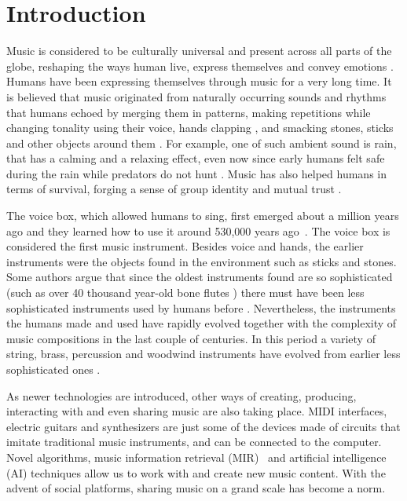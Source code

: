 \documentclass[sigchi]{acmart}
\begin{document}
\section{Introduction}
Music is considered to be culturally universal \cite{campbell1997music, seeger1971reflections} and present across all parts of the globe, reshaping the ways human live, express themselves and convey emotions  \cite{juslin2001music,montagu2017music}. Humans have been expressing themselves through music for a very long time.  It is believed that music originated from naturally occurring sounds and rhythms that humans echoed by merging them in patterns, making repetitions while changing tonality using their voice, hands clapping \cite{kassler1987dancing}, and smacking stones, sticks and other objects around them \cite{montagu2014horns}. For example, one of such ambient sound is rain, that has a calming and a relaxing effect, even now since early humans felt safe during the rain while predators do not hunt \cite{aramaki2017bridging}. Music has also helped humans 
in terms of survival, forging a sense of group identity and mutual trust \cite{conard2009new}.

The voice box, which allowed humans to sing, first emerged about a million years \cite{montagu2017music} ago and they learned how to use it around 530,000 years ago~\cite{morley2013prehistory}. The voice box is considered the first music instrument. Besides voice and hands, the earlier instruments were the objects found in the environment such as sticks and stones. Some authors argue that since the oldest instruments found are so sophisticated (such as over 40 thousand year-old bone flutes \cite{higham2012tauesting,wallin2001origins,conard2009new}) there must have been less sophisticated instruments used by humans before \cite{conard2009new,morley2013prehistory}. Nevertheless, the instruments the humans made and used have rapidly evolved together with the complexity of music compositions in the last couple of centuries. In this period a variety of string, brass, percussion and woodwind instruments have evolved from earlier less sophisticated ones \cite{conard2009female}.

As newer technologies are introduced, other ways of creating, producing, interacting with and even sharing music \cite{voida2005listening} are also taking place. MIDI interfaces, electric guitars and synthesizers are just some of the devices made of circuits that imitate traditional music instruments, and can be connected to the computer. Novel algorithms, music information retrieval (MIR)~\cite{downie2008music,downie2003music} and artificial intelligence (AI) techniques allow us to work with and create new music content. With the advent of social platforms, sharing music on a grand scale has become a norm.
\end{document}
